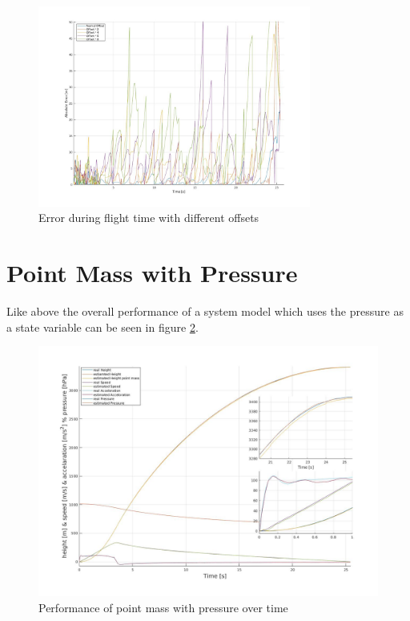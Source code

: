 \begin{figure}[h!]
 \centering
 \includegraphics[width=0.8\textwidth]{./Pictures/PointMassOffsetErrorWithOffset.jpg}
  \caption{Error during flight time with different offsets}
 \label{fig:PointMassOffsetErrorWithOffset}
\end{figure}
 

\newpage
\section{Point Mass with Pressure}
Like above the overall performance of a system model which uses the pressure as a state variable can be seen in figure \ref{fig:PointMassPressurePerformance}.

\begin{figure}[h!]
 \centering
 \includegraphics[width=.8 \textwidth]{./Pictures/PointMassPressurePerformance.jpg}
 \caption{Performance of point mass with pressure over time}
 \label{fig:PointMassPressurePerformance}
\end{figure}

